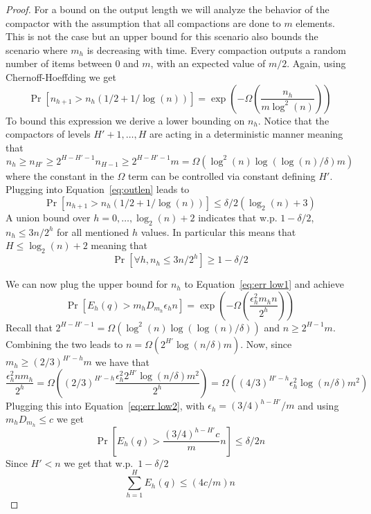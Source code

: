 \documentclass[anon,12pt]{colt2019} %
\newcommand{\eps}{\epsilon}
\renewcommand{\Pr}{\operatorname{Pr}}
\begin{document}
{\begin{proof}
For a bound on the output length we will analyze the behavior of the compactor with the assumption that all compactions are done to $m$ elements. This is not the case but an upper bound for this scenario also bounds the scenario where $m_h$ is decreasing with time. Every compaction outputs a random number of items between $0$ and $m$, with an expected value of $m/2$. Again, using Chernoff-Hoeffding we get
\begin{equation} \label{eq:outlen}
\Pr\left[ n_{h+1} > n_h(1/2+1/\log(n)) \right] = \exp \left( -\Omega\left( \frac{n_h}{m \log^2(n)} \right) \right) 
\end{equation}
To bound this expression we derive a lower bounding on $n_h$. Notice that the compactors of levels $H'+1,\ldots,H$ are acting in a deterministic manner meaning that 
$$n_h \geq n_{H'} \geq 2^{H-H'-1}n_{H-1} \geq 2^{H-H'-1}m = \Omega(\log^2(n)\log(\log(n)/\delta)m)$$
where the constant in the $\Omega$ term can be controlled via constant defining $H'$. Plugging into Equation~\eqref{eq:outlen} leads to
\begin{equation*} 
\Pr\left[ n_{h+1} > n_h(1/2+1/\log(n)) \right] \leq \delta/2(\log_2(n)+3)
\end{equation*}
A union bound over $h=0,\ldots,\log_2(n)+2$ indicates that w.p. $1-\delta/2$, $n_h \leq 3n/2^h$ for all mentioned $h$ values. In particular this means that $H \leq \log_2(n)+2$ meaning that 
\begin{equation} \label{eq:outlen2}
\Pr\left[ \forall h, n_h \leq 3n/2^h \right] \geq 1-\delta/2
\end{equation}

We can now plug the upper bound for $n_h$ to Equation~\ref{eq:err low1} and achieve 
\begin{equation} \label{eq:err low2}
\Pr\left[ E_h(q) > m_h D_{m_h} \eps_h n \right] = \exp \left( -\Omega\left( \frac{\eps_h^2 m_h n}{2^h} \right) \right)
\end{equation}
Recall that $2^{H-H'-1} = \Omega(\log^2(n)\log(\log(n)/\delta))$ and $n \geq 2^{H-1}m$. Combining the two leads to $n = \Omega(2^{H'}\log(n/\delta)m)$. Now, since $m_h \geq (2/3)^{H'-h}m$ we have that
$$
\frac{\eps_h^2 n m_h}{2^h} = \Omega\left( (2/3)^{H'-h} \frac{\eps_h^2 2^{H'} \log(n/\delta) m^2}{2^h} \right) = \Omega\left( (4/3)^{H'-h} \eps_h^2 \log(n/\delta) m^2 \right)
$$
Plugging this into Equation~\eqref{eq:err low2}, with $\eps_h = (3/4)^{h-H'}/m$ and using $m_h D_{m_h} \leq c$ we get
\begin{equation} \label{eq:err low3}
\Pr\left[ E_h(q) > \frac{(3/4)^{h-H'} c}{m} n \right]  \leq \delta/2n
\end{equation}
Since $H' < n$ we get that w.p.\ $1-\delta/2$
$$ \sum_{h=1}^H E_h(q) \leq (4c/m) n $$


\end{proof}}
\end{document}
